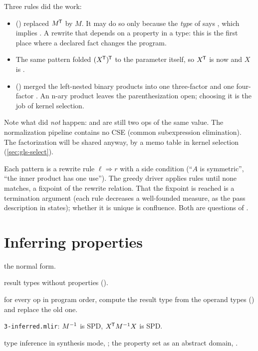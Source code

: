 Three rules did the work:
\begin{itemize}
\item {} ()
  replaced \(M^{\mkern-1.5mu\mathsf{T}}\) by \(M\). It may do so only because the \emph{type} of
   says , which implies . A rewrite
  that depends on a property in a type: this is the first place where a
  declared fact changes the program.
\item The same pattern folded \((X^{\mkern-1.5mu\mathsf{T}})^{\mkern-1.5mu\mathsf{T}}\) to the parameter itself, so
  \(X^{\mkern-1.5mu\mathsf{T}}\) is now  and \(X\) is .
\item {} () merged the
  left-nested binary products into one three-factor and one four-factor
  . An n-ary product leaves the parenthesization open;
  choosing it is the job of kernel selection.
\end{itemize}

Note what did \emph{not} happen:  and  are still two
 ops of the same value. The normalization pipeline contains
no CSE (common subexpression elimination). The factorization will be shared
anyway, by a memo table in kernel selection (\cref{sec:gls-select}).

\begin{theory}
Each pattern is a rewrite rule \(\ell \Rightarrow r\) with a side
condition (``\(A\) is symmetric'', ``the inner product has one use''). The
greedy driver applies rules until none matches, a fixpoint of the rewrite
relation. That the fixpoint is reached is a termination argument (each rule
decreases a well-founded measure, as the pass description in
 states); whether it is
unique is confluence. Both are questions of
.
\end{theory}

\section{Inferring properties}
\label{sec:gls-infer}

\begin{steps}
\item[Input] the normal form.
\item[Representation] result types without properties ().
\item[Rule] for every op in program order, compute the result type from the operand types () and replace the old one.
\item[Output] \texttt{3-inferred.mlir}: \(M^{-1}\) is SPD, \(X^{\mkern-1.5mu\mathsf{T}} M^{-1} X\) is SPD.
\item[Theory] type inference in synthesis mode, ; the property set as an abstract domain, .
\end{steps}

